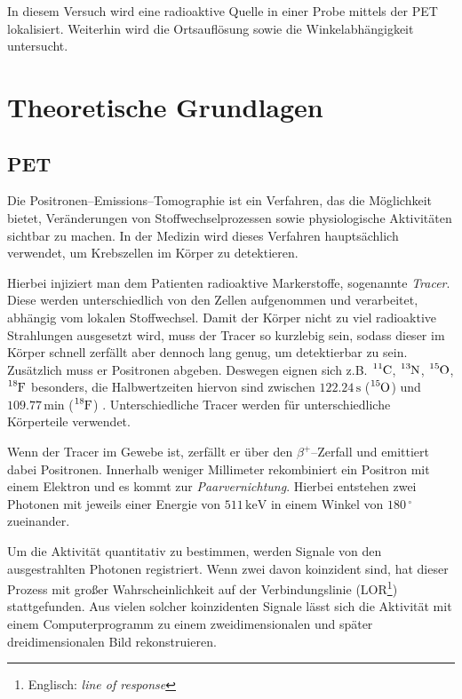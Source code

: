 \documentclass[12pt,a4paper]{scrartcl}
\numberwithin{equation}{section} %
\newcommand{\pu}[1]{\ensuremath{\mathrm{#1}}}
\begin{document}
In diesem Versuch wird eine radioaktive Quelle in einer Probe mittels der PET lokalisiert. Weiterhin wird die Ortsauflösung sowie die Winkelabhängigkeit untersucht.

\clearpage
\hypertarget{theoretische-grundlagen}{%
\section{Theoretische Grundlagen}\label{theoretische-grundlagen}}

\hypertarget{pet}{%
\subsection{PET}\label{pet}}
Die Positronen--Emissions--Tomographie ist ein Verfahren, das die Möglichkeit bietet, Veränderungen von Stoffwechselprozessen sowie physiologische Aktivitäten sichtbar zu machen. In der Medizin wird dieses Verfahren hauptsächlich verwendet, um Krebszellen im Körper zu detektieren.

Hierbei injiziert man dem Patienten radioaktive Markerstoffe, sogenannte \emph{Tracer}. Diese werden unterschiedlich von den Zellen aufgenommen und verarbeitet, abhängig vom lokalen Stoffwechsel. Damit der Körper nicht zu viel radioaktive Strahlungen ausgesetzt wird, muss der Tracer so kurzlebig sein, sodass dieser im Körper schnell zerfällt aber dennoch lang genug, um detektierbar zu sein. Zusätzlich muss er Positronen abgeben. Deswegen eignen sich z.B. $\ce{^{11}C}$, $\ce{^{13}N}$, $\ce{^{15}O}$, $\ce{^{18}F}$ besonders, die Halbwertzeiten hiervon sind zwischen $122.24 \,\mathrm s$ ($\ce{^{15}O}$) und $109.77\,\mathrm{min}$ ($\ce{^{18}F}$) \cite{NuclideChart}. Unterschiedliche Tracer werden für unterschiedliche Körperteile verwendet.

Wenn der Tracer im Gewebe ist, zerfällt er über den $\beta^+$--Zerfall und emittiert dabei Positronen. Innerhalb weniger Millimeter \cite{DGNM} rekombiniert ein Positron mit einem Elektron und es kommt zur \emph{Paarvernichtung}. Hierbei entstehen zwei Photonen mit jeweils einer Energie von $\pu{511 \,keV}$ in einem Winkel von $180\,^\circ$ zueinander. \cite{Bethge,DGNM,Annihilation}

Um die Aktivität quantitativ zu bestimmen, werden Signale von den ausgestrahlten Photonen registriert. Wenn zwei davon koinzident sind, hat dieser Prozess mit großer Wahrscheinlichkeit auf der Verbindungslinie (LOR\footnote{Englisch: \emph{line of response}}) stattgefunden. Aus vielen solcher koinzidenten Signale lässt sich die Aktivität mit einem Computerprogramm zu einem zweidimensionalen und später dreidimensionalen Bild rekonstruieren.
\end{document}
